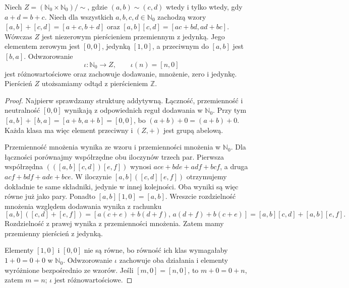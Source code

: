 \begin{twierdzenie}
\label{aa:tw:integers-as-ring}
Niech $Z=(\mathbb N_0\times\mathbb N_0)/\sim$, gdzie
$(a,b)\sim(c,d)$ wtedy i tylko wtedy, gdy $a+d=b+c$.
Niech dla wszystkich $a,b,c,d\in\mathbb N_0$ zachodzą wzory
$[a,b]+[c,d]=[a+c,b+d]$ oraz
$[a,b][c,d]=[ac+bd,ad+bc]$.
Wówczas $Z$ jest niezerowym pierścieniem przemiennym z jedynką.
Jego elementem zerowym
jest $[0,0]$, jedynką $[1,0]$, a przeciwnym do $[a,b]$
jest $[b,a]$. Odwzorowanie
\[
 \iota:\mathbb N_0\longrightarrow Z,\qquad \iota(n)=[n,0]
\]
jest różnowartościowe oraz zachowuje dodawanie,
mnożenie, zero i jedynkę. Pierścień $Z$ utożsamiamy
odtąd z pierścieniem $\mathbb Z$.
\end{twierdzenie}
\begin{proof}
Najpierw sprawdzamy strukturę addytywną. Łączność,
przemienność i neutralność $[0,0]$ wynikają z
odpowiednich reguł dodawania w $\mathbb N_0$.
Przy tym
$[a,b]+[b,a]=[a+b,a+b]=[0,0]$,
bo $(a+b)+0=(a+b)+0$. Każda klasa ma więc element
przeciwny i $(Z,+)$ jest grupą abelową.

Przemienność mnożenia wynika ze wzoru i przemienności
mnożenia w $\mathbb N_0$. Dla łączności porównajmy
współrzędne obu iloczynów trzech par. Pierwsza współrzędna
$(([a,b][c,d])[e,f])$ wynosi
$ace+bde+adf+bcf$, a druga
$acf+bdf+ade+bce$. W iloczynie
$[a,b]([c,d][e,f])$ otrzymujemy dokładnie te same
składniki, jedynie w innej kolejności. Oba wyniki są więc
równe już jako pary. Ponadto
$[a,b][1,0]=[a,b]$. Wreszcie rozdzielność
mnożenia względem dodawania wynika z rachunku
\[
 [a,b]([c,d]+[e,f])
 =[a(c+e)+b(d+f),\,a(d+f)+b(c+e)]
 =[a,b][c,d]+[a,b][e,f].
\]
Rozdzielność z prawej wynika z przemienności mnożenia.
Zatem mamy przemienny pierścień z jedynką.

Elementy $[1,0]$ i $[0,0]$ nie są równe, bo równość
ich klas wymagałaby $1+0=0+0$ w $\mathbb N_0$.
Odwzorowanie $\iota$ zachowuje oba działania i elementy
wyróżnione bezpośrednio ze wzorów. Jeśli
$[m,0]=[n,0]$, to $m+0=0+n$, zatem $m=n$;
$\iota$ jest różnowartościowe.
\end{proof}

